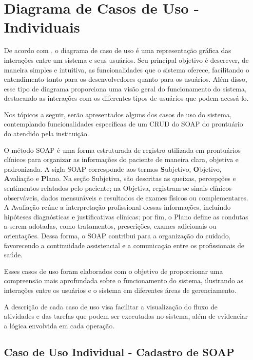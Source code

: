 \section{Diagrama de Casos de Uso - Individuais}

De acordo com \textcite{Guedes2018}, o diagrama de caso de uso é uma representação gráfica das interações entre um sistema e seus usuários. Seu principal objetivo é descrever, de maneira simples e intuitiva, as funcionalidades que o sistema oferece, facilitando o entendimento tanto para os desenvolvedores quanto para os usuários. Além disso, esse tipo de diagrama proporciona uma visão geral do funcionamento do sistema, destacando as interações com os diferentes tipos de usuários que podem acessá-lo.

Nos tópicos a seguir, serão apresentados alguns dos casos de uso do sistema, contemplando funcionalidades específicas de um CRUD do SOAP do prontuário do atendido pela instituição.

O método SOAP é uma forma estruturada de registro utilizada em prontuários clínicos para organizar as informações do paciente de maneira clara, objetiva e padronizada. A sigla SOAP corresponde aos termos \textbf{S}ubjetivo, \textbf{O}bjetivo, \textbf{A}valiação e \textbf{P}lano. Na seção Subjetiva, são descritas as queixas, percepções e sentimentos relatados pelo paciente; na Objetiva, registram-se sinais clínicos observáveis, dados mensuráveis e resultados de exames físicos ou complementares. A Avaliação reúne a interpretação profissional dessas informações, incluindo hipóteses diagnósticas e justificativas clínicas; por fim, o Plano define as condutas a serem adotadas, como tratamentos, prescrições, exames adicionais ou orientações. Dessa forma, o SOAP contribui para a organização do cuidado, favorecendo a continuidade assistencial e a comunicação entre os profissionais de saúde.
 
Esses casos de uso foram elaborados com o objetivo de proporcionar uma compreensão mais aprofundada sobre o funcionamento do sistema, ilustrando as interações entre os usuários e o sistema em diferentes áreas de gerenciamento.

A descrição de cada caso de uso visa facilitar a visualização do fluxo de atividades e das tarefas que podem ser executadas no sistema, além de evidenciar a lógica envolvida em cada operação.

\subsection{Caso de Uso Individual - Cadastro de SOAP}

